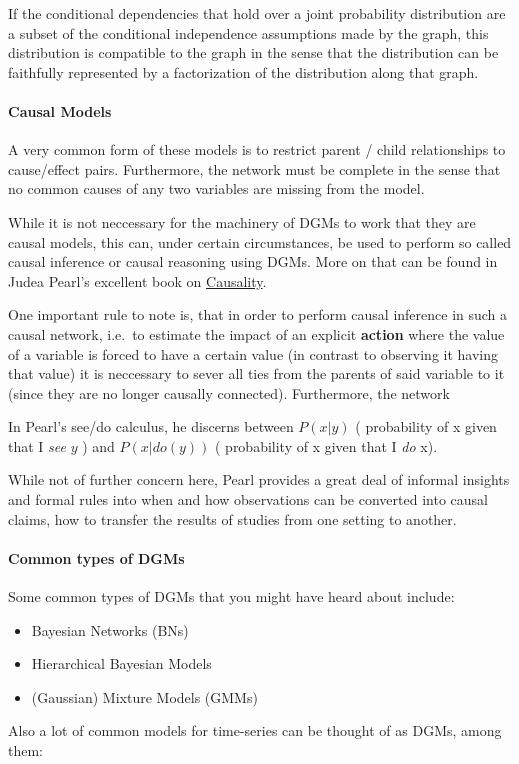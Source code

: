\documentclass[letterpaper,10pt,english]{/home/londenberg/python-env/clean/lib/python2.7/site-packages/sphinx/texinputs/sphinxhowto}
\begin{document}
If the conditional dependencies that hold over a joint probability
distribution are a subset of the conditional independence assumptions
made by the graph, this distribution is compatible to the graph in the
sense that the distribution can be faithfully represented by a
factorization of the distribution along that graph.\paragraph{Causal Models}

A very common form of these models is to restrict parent / child
relationships to cause/effect pairs. Furthermore, the network must be
complete in the sense that no common causes of any two variables are
missing from the model.

While it is not neccessary for the machinery of DGMs to work that they
are causal models, this can, under certain circumstances, be used to
perform so called causal inference or causal reasoning using DGMs. More
on that can be found in Judea Pearl's excellent book on
\href{http://bayes.cs.ucla.edu/BOOK-2K/}{Causality}.

One important rule to note is, that in order to perform causal inference
in such a causal network, i.e.~to estimate the impact of an explicit
\textbf{action} where the value of a variable is forced to have a
certain value (in contrast to observing it having that value) it is
neccessary to sever all ties from the parents of said variable to it
(since they are no longer causally connected). Furthermore, the network

In Pearl's see/do calculus, he discerns between $P(x|y)$ ( probability
of x given that I \emph{see} $y$ ) and $P(x|do(y))$ ( probability of x
given that I \emph{do} x).

While not of further concern here, Pearl provides a great deal of
informal insights and formal rules into when and how observations can be
converted into causal claims, how to transfer the results of studies
from one setting to another.\paragraph{Common types of DGMs}

Some common types of DGMs that you might have heard about include:

\begin{itemize}
\item
  Bayesian Networks (BNs)
\item
  Hierarchical Bayesian Models
\item
  (Gaussian) Mixture Models (GMMs)
\end{itemize}
Also a lot of common models for time-series can be thought of as DGMs,
among them:
\end{document}
